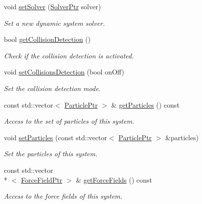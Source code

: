 \begin{DoxyCompactItemize}
void \hyperlink{classDynamicSystem_a87567a49ba603ad86ea53e8d4ade3a6b}{set\+Solver} (\hyperlink{Solver_8hpp_a0913049810bea42e7eeb97b03da7a93d}{Solver\+Ptr} solver)
\begin{DoxyCompactList}\small\item\em Set a new dynamic system solver. \end{DoxyCompactList}\item 
bool \hyperlink{classDynamicSystem_ad09d6d1870ba51b969238015733c41d4}{get\+Collision\+Detection} ()
\begin{DoxyCompactList}\small\item\em Check if the collision detection is activated. \end{DoxyCompactList}\item 
void \hyperlink{classDynamicSystem_a9845f985a6e0a8d3069aa7f85e6abbc4}{set\+Collisions\+Detection} (bool on\+Off)
\begin{DoxyCompactList}\small\item\em Set the collision detection mode. \end{DoxyCompactList}\item 
const std\+::vector$<$ \hyperlink{Particle_8hpp_a9a7abc8635002993537b61ef2c857fdd}{Particle\+Ptr} $>$ \& \hyperlink{classDynamicSystem_a53c25f86bfdb432b52be3917b415b3ed}{get\+Particles} () const 
\begin{DoxyCompactList}\small\item\em Access to the set of particles of this system. \end{DoxyCompactList}\item 
void \hyperlink{classDynamicSystem_a6a67f92c605c9d4e28e65bd891f38df9}{set\+Particles} (const std\+::vector$<$ \hyperlink{Particle_8hpp_a9a7abc8635002993537b61ef2c857fdd}{Particle\+Ptr} $>$ \&particles)
\begin{DoxyCompactList}\small\item\em Set the particles of this system. \end{DoxyCompactList}\item 
const std\+::vector\\*
$<$ \hyperlink{ForceField_8hpp_a42f2dc2cbbb9e0d734b92850c7b40d58}{Force\+Field\+Ptr} $>$ \& \hyperlink{classDynamicSystem_a03acc80081da8b53d6c15088316e2cc6}{get\+Force\+Fields} () const 
\begin{DoxyCompactList}\small\item\em Access to the force fields of this system. \end{DoxyCompactList}\item 

\end{DoxyCompactItemize}

